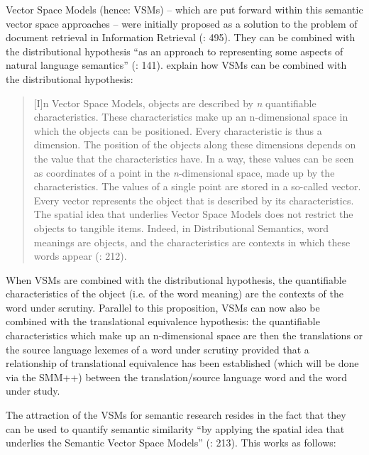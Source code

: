 Vector Space Models (hence: VSMs) – which are put forward within this semantic vector space approaches – were initially proposed as a solution to the problem of document retrieval in Information Retrieval (\citealt{lappin_vector_2015}: 495). They can be combined with the distributional hypothesis “as an approach to representing some aspects of natural language semantics” (\citealt{turney_frequency_2010}: 141). \citet[212]{szmrecsanyi_semantic_2014} explain how VSMs can be combined with the distributional hypothesis:


\begin{quote}
[I]n Vector Space Models, objects are described by \textit{n} quantifiable characteristics. These characteristics make up an n{}-dimensional space in which the objects can be positioned. Every characteristic is thus a dimension. The position of the objects along these dimensions depends on the value that the characteristics have. In a way, these values can be seen as coordinates of a point in the \textit{n}{}-dimensional space, made up by the characteristics. The values of a single point are stored in a so-called vector. Every vector represents the object that is described by its characteristics. The spatial idea that underlies Vector Space Models does not restrict the objects to tangible items. Indeed, in Distributional Semantics, word meanings are objects, and the characteristics are contexts in which these words appear (\citealt{szmrecsanyi_semantic_2014}: 212).
\end{quote}


When VSMs are combined with the distributional hypothesis, the quantifiable characteristics of the object (i.e. of the word meaning) are the contexts of the word under scrutiny. Parallel to this proposition, VSMs can now also be combined with the translational equivalence hypothesis: the quantifiable characteristics which make up an n-dimensional space are then the translations or the source language lexemes of a word under scrutiny provided that a relationship of translational equivalence has been established (which will be done via the SMM++) between the translation/source language word and the word under study.



The attraction of the VSMs for semantic research resides in the fact that they can be used to quantify semantic similarity “by applying the spatial idea that underlies the Semantic Vector Space Models” (\citealt{szmrecsanyi_semantic_2014}: 213). This works as follows:


